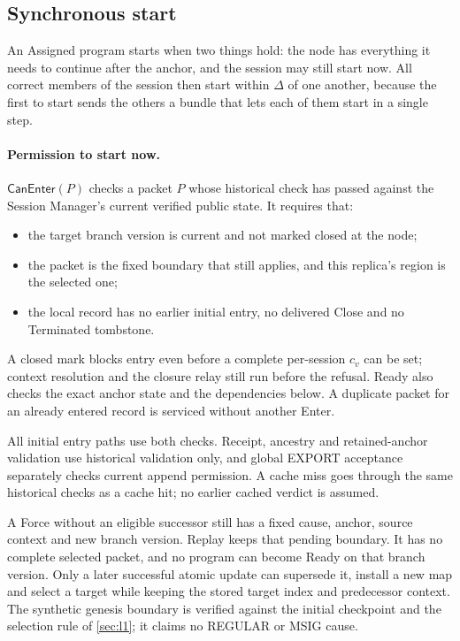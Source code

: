 \documentclass[11pt,a4paper]{article}
\newcommand{\tagg}[1]{\ensuremath{\mathsf{#1}}}
\begin{document}
\subsection{Synchronous start}
\label{sec:ready}
An Assigned program starts when two things hold: the node has
everything it needs to continue after the anchor, and the session may
still start now. All correct members of the session then start within
$\Delta$ of one another, because the first to start sends the others a
bundle that lets each of them start in a single step.

\paragraph{Permission to start now.}
\label{sec:can-enter}
$\tagg{CanEnter}(P)$ checks a packet $P$ whose historical check has
passed against the Session Manager's current verified public state. It
requires that:
\begin{itemize}
\item the target branch version is current and not marked closed at
the node;
\item the packet is the fixed boundary that still applies, and this
replica's region is the selected one;
\item the local record has no earlier initial entry, no delivered Close
and no Terminated tombstone.
\end{itemize}
A closed mark blocks entry even before a complete per-session $c_v$ can
be set; context resolution and the closure relay still run before the
refusal. Ready also checks the exact anchor state and the dependencies
below. A duplicate packet for an already entered record is serviced
without another Enter.

All initial entry paths use both checks. Receipt, ancestry and
retained-anchor validation use historical validation only, and global
EXPORT acceptance separately checks current append permission. A cache
miss goes through the same historical checks as a cache hit; no earlier
cached verdict is assumed.

A Force without an eligible successor still has a fixed cause, anchor,
source context and new branch version. Replay keeps that
pending boundary. It has no complete selected packet, and no program can
become Ready on that branch version. Only a later successful atomic
update can supersede it, install a new map and select a target while
keeping the stored target index and predecessor context. The synthetic genesis boundary is verified
against the initial checkpoint and the selection rule of \cref{sec:l1};
it claims no REGULAR or MSIG cause.
\end{document}
